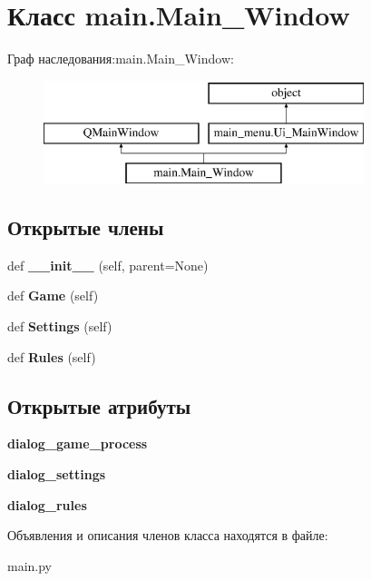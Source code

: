 \hypertarget{classmain_1_1_main___window}{}\section{Класс main.\+Main\+\_\+\+Window}
\label{classmain_1_1_main___window}
Граф наследования\+:main.\+Main\+\_\+\+Window\+:\begin{figure}[H]
\begin{center}
\leavevmode
\includegraphics[height=3.000000cm]{classmain_1_1_main___window}
\end{center}
\end{figure}
\subsection*{Открытые члены}
\begin{DoxyCompactItemize}
\item 
\mbox{\label{classmain_1_1_main___window_acefde145fb95483bba9213add92a0935}} 
def {\bfseries \+\_\+\+\_\+init\+\_\+\+\_\+} (self, parent=None)
\item 
\mbox{\label{classmain_1_1_main___window_a0c50fb17eb1e8f2452b597abb3555781}} 
def {\bfseries Game} (self)
\item 
\mbox{\label{classmain_1_1_main___window_a13a951e7b7b86f2163a65fadad80e9af}} 
def {\bfseries Settings} (self)
\item 
\mbox{\label{classmain_1_1_main___window_a23677aa624a8c295bfcd46f01915764b}} 
def {\bfseries Rules} (self)
\end{DoxyCompactItemize}
\subsection*{Открытые атрибуты}
\begin{DoxyCompactItemize}
\item 
\mbox{\label{classmain_1_1_main___window_aaeff37bef709cfc647a7893d220120df}} 
{\bfseries dialog\+\_\+game\+\_\+process}
\item 
\mbox{\label{classmain_1_1_main___window_a49827a51b0671b8941aa78d7d2d57232}} 
{\bfseries dialog\+\_\+settings}
\item 
\mbox{\label{classmain_1_1_main___window_ae5fe228f176a3ca7834d0cf3de67cfa9}} 
{\bfseries dialog\+\_\+rules}
\end{DoxyCompactItemize}


Объявления и описания членов класса находятся в файле\+:\begin{DoxyCompactItemize}
\item 
main.\+py\end{DoxyCompactItemize}
